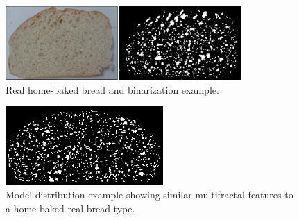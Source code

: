\documentclass[spanish,a4paper,11pt,oneside,links]{report}
\begin{document}
\begin{figure}[!ht]
\begin{center}
\includegraphics[width=9cm]{figures/realbin2}
\caption{ Real home-baked bread and binarization example.}
\label{realbin2}
\end{center}
\end{figure}

\begin{figure}[!ht]
\begin{center}
\includegraphics[width=6cm]{figures/best2}
\caption{Model distribution example showing similar multifractal features to a home-baked real bread type.}
\label{best2}
\end{center}
\end{figure}





\end{document}
